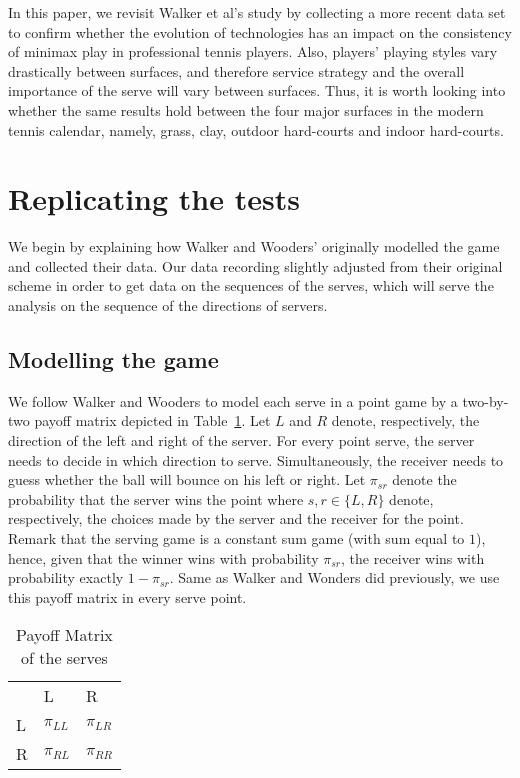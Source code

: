 \documentclass[11pt]{article}
\begin{document}
In this paper, we revisit Walker et al's study by collecting a more recent data set to confirm whether the evolution of technologies has an impact on the consistency of minimax play in professional tennis players. Also, players' playing styles vary drastically between surfaces, and therefore service strategy and the overall importance of the serve will vary between surfaces. Thus, it is worth looking into whether the same results hold between the four major surfaces in the modern tennis calendar, namely, grass, clay, outdoor hard-courts and indoor hard-courts.

\section{Replicating the tests}

We begin by explaining how Walker and Wooders' originally modelled the game and collected their data. Our data recording slightly adjusted from their original scheme in order to get data on the sequences of the serves, which will serve the analysis on the sequence of the directions of servers.

\subsection{Modelling the game}
We follow Walker and Wooders to model each serve in a point game by a two-by-two payoff matrix depicted in Table~\ref{table:payoffmatrix}. Let $L$ and $R$ denote, respectively, the direction of the left and right of the server. For every point serve, the server needs to decide in which direction to serve. Simultaneously, the receiver needs to guess whether the ball will bounce on his left or right. Let $\pi_{sr}$ denote the probability that the server wins the point where $s,r \in \{L, R \}$ denote, respectively, the choices made by the server and the receiver for the point. Remark that the serving game is a constant sum game (with sum equal to $1$), hence, given that the winner wins with probability $\pi_{sr}$, the receiver wins with probability exactly $1 - \pi_{sr}$. Same as Walker and Wonders did previously, we use this payoff matrix in every serve point.

\begin{table}[h]
\caption{Payoff Matrix of the serves}
\label{table:payoffmatrix}
\centering
\begin{tabular}{lll}
                       & L                             & R                             \\ \cline{2-3} 
\multicolumn{1}{l|}{L} & \multicolumn{1}{l|}{$\pi_{LL}$} & \multicolumn{1}{l|}{$\pi_{LR}$} \\ \cline{2-3} 
\multicolumn{1}{l|}{R} & \multicolumn{1}{l|}{$\pi_{RL}$} & \multicolumn{1}{l|}{$\pi_{RR}$} \\ \cline{2-3} 
\end{tabular}
\end{table}
\end{document}
